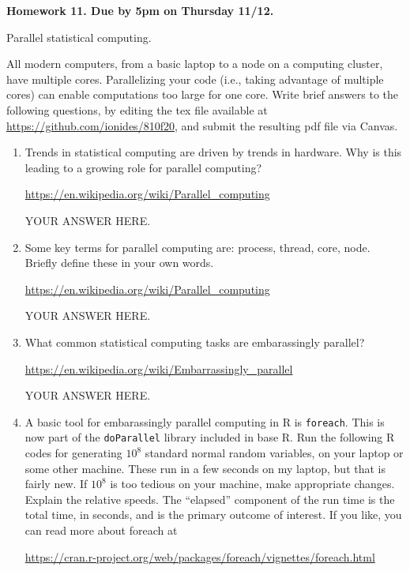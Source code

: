 \documentclass[12pt]{article}
\begin{document}
\begin{center}\bf
Homework 11. Due by 5pm on Thursday 11/12.

Parallel statistical computing.

\end{center}

All modern computers, from a basic laptop to a node on a computing cluster, have multiple cores. Parallelizing your code (i.e., taking advantage of multiple cores) can enable computations too large for one core. Write brief answers to the following questions, by editing the tex file available at \url{https://github.com/ionides/810f20}, and submit the resulting pdf file via Canvas. 

\begin{enumerate}

\item Trends in statistical computing are driven by trends in hardware. Why is this leading to a growing role for parallel computing?

\url{https://en.wikipedia.org/wiki/Parallel_computing}

YOUR ANSWER HERE.

\item Some key terms for parallel computing are: process, thread, core, node. Briefly define these in your own words.

\url{https://en.wikipedia.org/wiki/Parallel_computing}

YOUR ANSWER HERE.
  
\item What common statistical computing tasks are embarassingly parallel?

\url{https://en.wikipedia.org/wiki/Embarrassingly_parallel}

YOUR ANSWER HERE.

\item A basic tool for embarassingly parallel computing in R is \texttt{foreach}. This is now part of the \texttt{doParallel} library included in base R. Run the following R codes for generating $10^8$ standard normal random variables, on your laptop or some other machine.  These run in a few seconds on my laptop, but that is fairly new. If $10^8$ is too tedious on your machine, make appropriate changes. Explain the relative speeds. The ``elapsed'' component of the run time is the total time, in seconds, and is the primary outcome of interest. If you like, you can read more about foreach at
  
\url{https://cran.r-project.org/web/packages/foreach/vignettes/foreach.html}


\end{enumerate}
\end{document}
